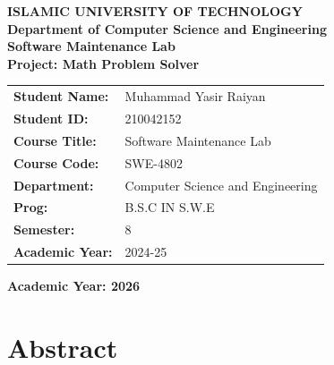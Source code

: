 \documentclass[12pt,a4paper]{report}
\begin{document}

\begin{titlepage}
    \centering

    \vspace*{1cm}

    {\Large \textbf{ISLAMIC UNIVERSITY OF TECHNOLOGY}}\\[0.3cm]
    {\large \textbf{Department of Computer Science and Engineering}}\\[1.5cm]

    {\Huge \textbf{Software Maintenance Lab}}\\[0.5cm]


    {\Large \textbf{Project: Math Problem Solver}}\\[2cm]

    \begin{tabular}{ll}
        \textbf{Student Name:} & Muhammad Yasir Raiyan \\
        \textbf{Student ID:} & 210042152 \\
        \textbf{Course Title:} &  Software Maintenance Lab \\
        \textbf{Course Code:} &  SWE-4802 \\
        \textbf{Department:} & Computer Science and Engineering \\
        \textbf{Prog:} & B.S.C IN S.W.E \\
        \textbf{Semester:} & 8 \\
        \textbf{Academic Year:} & 2024-25\\
       
        
    \end{tabular}

    \vfill

    {\large \textbf{Academic Year: 2026}}

\end{titlepage}


\tableofcontents
\newpage


\chapter*{Abstract}
\end{document}
